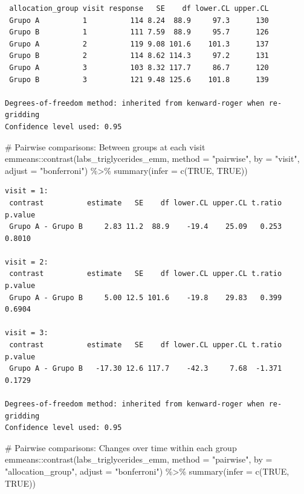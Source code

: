 \documentclass[
  letterpaper,
  DIV=11,
  numbers=noendperiod]{scrartcl}
\newenvironment{Shaded}{\begin{snugshade}}{\end{snugshade}}
\newcommand{\AttributeTok}[1]{\textcolor[rgb]{0.40,0.45,0.13}{#1}}
\newcommand{\CommentTok}[1]{\textcolor[rgb]{0.37,0.37,0.37}{#1}}
\newcommand{\ConstantTok}[1]{\textcolor[rgb]{0.56,0.35,0.01}{#1}}
\newcommand{\FunctionTok}[1]{\textcolor[rgb]{0.28,0.35,0.67}{#1}}
\newcommand{\NormalTok}[1]{\textcolor[rgb]{0.00,0.23,0.31}{#1}}
\newcommand{\SpecialCharTok}[1]{\textcolor[rgb]{0.37,0.37,0.37}{#1}}
\newcommand{\StringTok}[1]{\textcolor[rgb]{0.13,0.47,0.30}{#1}}
\begin{document}
\begin{verbatim}
 allocation_group visit response   SE    df lower.CL upper.CL
 Grupo A          1          114 8.24  88.9     97.3      130
 Grupo B          1          111 7.59  88.9     95.7      126
 Grupo A          2          119 9.08 101.6    101.3      137
 Grupo B          2          114 8.62 114.3     97.2      131
 Grupo A          3          103 8.32 117.7     86.7      120
 Grupo B          3          121 9.48 125.6    101.8      139

Degrees-of-freedom method: inherited from kenward-roger when re-gridding 
Confidence level used: 0.95 
\end{verbatim}

\begin{Shaded}
\begin{Highlighting}[]
\CommentTok{\# Pairwise comparisons: Between groups at each visit}
\NormalTok{emmeans}\SpecialCharTok{::}\FunctionTok{contrast}\NormalTok{(labs\_triglycerides\_emm, }\AttributeTok{method =} \StringTok{"pairwise"}\NormalTok{, }\AttributeTok{by =} \StringTok{"visit"}\NormalTok{, }\AttributeTok{adjust =} \StringTok{"bonferroni"}\NormalTok{) }\SpecialCharTok{\%\textgreater{}\%} \FunctionTok{summary}\NormalTok{(}\AttributeTok{infer =} \FunctionTok{c}\NormalTok{(}\ConstantTok{TRUE}\NormalTok{, }\ConstantTok{TRUE}\NormalTok{))}
\end{Highlighting}
\end{Shaded}

\begin{verbatim}
visit = 1:
 contrast          estimate   SE    df lower.CL upper.CL t.ratio p.value
 Grupo A - Grupo B     2.83 11.2  88.9    -19.4    25.09   0.253  0.8010

visit = 2:
 contrast          estimate   SE    df lower.CL upper.CL t.ratio p.value
 Grupo A - Grupo B     5.00 12.5 101.6    -19.8    29.83   0.399  0.6904

visit = 3:
 contrast          estimate   SE    df lower.CL upper.CL t.ratio p.value
 Grupo A - Grupo B   -17.30 12.6 117.7    -42.3     7.68  -1.371  0.1729

Degrees-of-freedom method: inherited from kenward-roger when re-gridding 
Confidence level used: 0.95 
\end{verbatim}

\begin{Shaded}
\begin{Highlighting}[]
\CommentTok{\# Pairwise comparisons: Changes over time within each group}
\NormalTok{emmeans}\SpecialCharTok{::}\FunctionTok{contrast}\NormalTok{(labs\_triglycerides\_emm, }\AttributeTok{method =} \StringTok{"pairwise"}\NormalTok{, }\AttributeTok{by =} \StringTok{"allocation\_group"}\NormalTok{, }\AttributeTok{adjust =} \StringTok{"bonferroni"}\NormalTok{) }\SpecialCharTok{\%\textgreater{}\%} \FunctionTok{summary}\NormalTok{(}\AttributeTok{infer =} \FunctionTok{c}\NormalTok{(}\ConstantTok{TRUE}\NormalTok{, }\ConstantTok{TRUE}\NormalTok{))}
\end{Highlighting}
\end{Shaded}
\end{document}
